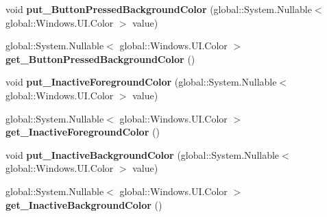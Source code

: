 \begin{DoxyCompactItemize}
\mbox{\label{class_windows_1_1_u_i_1_1_view_management_1_1_application_view_title_bar_ac6b52566c45f42efc81c9a0e973afa85}} 
void {\bfseries put\+\_\+\+Button\+Pressed\+Background\+Color} (global\+::\+System.\+Nullable$<$ global\+::\+Windows.\+U\+I.\+Color $>$ value)
\item 
\mbox{\label{class_windows_1_1_u_i_1_1_view_management_1_1_application_view_title_bar_af882393a152b9df371e3781f739cabac}} 
global\+::\+System.\+Nullable$<$ global\+::\+Windows.\+U\+I.\+Color $>$ {\bfseries get\+\_\+\+Button\+Pressed\+Background\+Color} ()
\item 
\mbox{\label{class_windows_1_1_u_i_1_1_view_management_1_1_application_view_title_bar_ab42ad105c4bc400b515275e8802c38ad}} 
void {\bfseries put\+\_\+\+Inactive\+Foreground\+Color} (global\+::\+System.\+Nullable$<$ global\+::\+Windows.\+U\+I.\+Color $>$ value)
\item 
\mbox{\label{class_windows_1_1_u_i_1_1_view_management_1_1_application_view_title_bar_a5258d150c16f577f11ca52e8b41ba734}} 
global\+::\+System.\+Nullable$<$ global\+::\+Windows.\+U\+I.\+Color $>$ {\bfseries get\+\_\+\+Inactive\+Foreground\+Color} ()
\item 
\mbox{\label{class_windows_1_1_u_i_1_1_view_management_1_1_application_view_title_bar_aa912163f22981533bcaf244d367a36e0}} 
void {\bfseries put\+\_\+\+Inactive\+Background\+Color} (global\+::\+System.\+Nullable$<$ global\+::\+Windows.\+U\+I.\+Color $>$ value)
\item 
\mbox{\label{class_windows_1_1_u_i_1_1_view_management_1_1_application_view_title_bar_aab1e5ef6e2bc37796640ab4cd4c4d182}} 
global\+::\+System.\+Nullable$<$ global\+::\+Windows.\+U\+I.\+Color $>$ {\bfseries get\+\_\+\+Inactive\+Background\+Color} ()
\item 
\mbox{\label{class_windows_1_1_u_i_1_1_view_management_1_1_application_view_title_bar_a24fc97928a847870e480f914ee47dfb5}} 

\end{DoxyCompactItemize}
